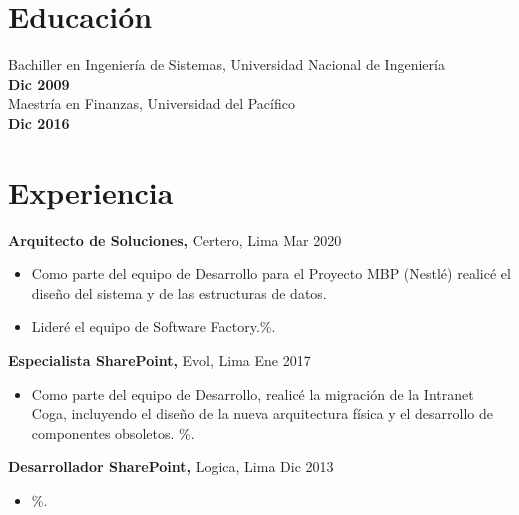 \documentclass[margin]{res}
\begin{document}
 
 
 
\address{{\bf Dirección} \\ Jr. Galvez Chipoco 360 \\ Cercado Lima, Lima 01  \\
        (51) 991139451 }
\address{{\bf josevegar@gmail.com \\ jvegar@uni.pe \\ github: \underline{\url{https://github.com/jvegar}} } }

 
\begin{resume} 
 
\section{Educación} 
Bachiller en Ingeniería de Sistemas, Universidad Nacional de Ingeniería \\ \textbf{Dic 2009} \\
Maestría en Finanzas, Universidad del Pacífico \\ \textbf{Dic 2016} \\

\section{Experiencia}
 {\bf Arquitecto de Soluciones,} Certero, Lima \hfill Mar  2020
 \begin{itemize} \itemsep -2pt  %
 \item Como parte del equipo de Desarrollo para el Proyecto MBP (Nestlé) realicé el diseño del sistema y de las estructuras de datos.
 \item Lideré el equipo de Software Factory.\%.
 \end{itemize}

 
 
{\bf Especialista SharePoint,} Evol, Lima \hfill  Ene 2017
\begin{itemize} \itemsep -2pt %
\item Como parte del equipo de Desarrollo, realicé la migración de la Intranet Coga, incluyendo el diseño 
de la nueva arquitectura física y el desarrollo de componentes obsoletos. \%.
\end{itemize}

{\bf Desarrollador SharePoint,} Logica, Lima \hfill  Dic 2013
\begin{itemize} \itemsep -2pt %
\item \%.
\end{itemize}


\end{resume}
\end{document}
